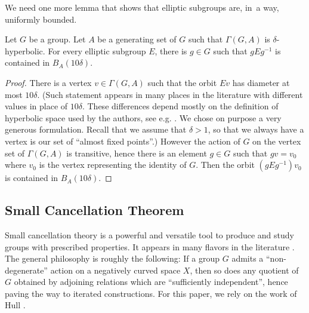 We need one more lemma that shows that elliptic subgroups are, in~a way, uniformly bounded.

\begin{lemma}
\label{lem:elliptic}
Let $G$ be a group.
Let $A$ be a generating set of $G$ such that $\Gamma(G,A)$ is $\delta$-hyperbolic.
For every elliptic subgroup $E$, there is $g \in G$ such that $gEg^{-1}$ is contained in $B_A(10\delta)$.
\end{lemma}

\begin{proof}
There is a vertex $v \in \Gamma(G, A)$ such that the orbit $Ev$ has diameter at most $10\delta$. (Such statement appears in many places in the literature with different values in place of $10\delta$. These differences depend mostly on the definition of hyperbolic space used by the authors, see e.g. \cite[III.$\Gamma$, Lem.\,3.3]{BH}. We chose on purpose a very generous formulation. Recall that we assume that $\delta > 1$, so that we always have a vertex is our set of ``almost fixed points''.)
However the action of $G$ on the vertex set of $\Gamma(G,A)$ is transitive, hence there is an element $g \in G$ such that $gv = v_0$ where $v_0$ is the vertex representing the identity of $G$.
Then the orbit $(g E g^{-1}) v_0$ is contained in $B_A(10 \delta)$.
\end{proof}

\subsection{Small Cancellation Theorem}

Small cancellation theory is a powerful and versatile tool to produce and study groups with prescribed properties.
It appears in many flavors in the literature \cite{Lyndon:2001wm,Olshanskii:1991wv, Gromov:2001us, Osin:2010dx, Coulon:2014fr,DGO}.
The general philosophy is roughly the following: If a group $G$ admits a ``non-degenerate'' action on a negatively curved space $X$, then so does any quotient of $G$ obtained by adjoining relations which are ``sufficiently independent'', hence paving the way to iterated constructions.
For this paper, we rely on the work of Hull \cite{hull}.

